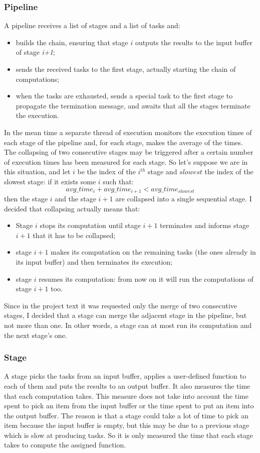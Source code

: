\documentclass[12pt]{article}
\begin{document}
\subsubsection{Pipeline}
A pipeline receives a list of stages and a list of tasks and:
\begin{itemize}
\item builds the chain, ensuring that stage $i$ outputs the results to the input buffer of stage \textit{i+1};
\item sends the received tasks to the first stage, actually starting the chain of computations;
\item when the tasks are exhausted, sends a special task to the first stage to propagate the termination message, and awaits that all the stages terminate the execution.
\end{itemize}
In the mean time a separate thread of execution monitors the execution times of each stage of the pipeline and, for each stage, makes the average of the times. The collapsing of two consecutive stages may be triggered after a certain number of execution times has been measured for each stage. So let's suppose we are in this situation, and let $i$ be the index of the $i^{th}$ stage and $slowest$ the index of the slowest stage: if it exists some $i$ such that: \[ avg\_time_{i} + avg\_time_{i+1} < avg\_time_{slowest} \] then the stage $i$ and the stage $i+1$ are collapsed into a single sequential stage. I decided that collapsing actually means that:
\begin{itemize}
\item Stage $i$ stops its computation until stage $i+1$ terminates and informs stage $i+1$ that it has to be collapsed; 
\item stage $i+1$ makes its computation on the remaining tasks (the ones already in its input buffer) and then terminates its execution;
\item stage $i$ resumes its computation: from now on it will run the computations of stage $i+1$ too.
\end{itemize}
Since in the project text it was requested only the merge of two consecutive stages, I decided that a stage can merge the adjacent stage in the pipeline, but not more than one. In other words, a stage can at most run its computation and the next stage's one. 

\subsubsection{Stage}
A stage picks the tasks from an input buffer, applies a user-defined function to each of them and puts the results to an output buffer. It also measures the time that each computation takes. This measure does not take into account the time spent to pick an item from the input buffer or the time spent to put an item into the output buffer. The reason is that a stage could take a lot of time to pick an item because the input buffer is empty, but this may be due to a previous stage which is slow at producing tasks. So it is only measured the time that each stage takes to compute the assigned function. 
\end{document}
